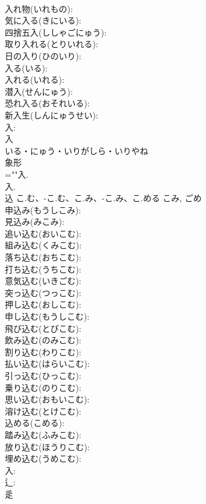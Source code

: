 \documentclass[8pt]{extreport}
\begin{document}
\begin{CJK}{UTF8}{min}
\\	入れ物(いれもの): 
\\	気に入る(きにいる): 
\\	四捨五入(ししゃごにゅう): 
\\	取り入れる(とりいれる): 
\\	日の入り(ひのいり): 
\\	入る(いる): 
\\	入れる(いれる): 
\\	潜入(せんにゅう): 
\\	恐れ入る(おそれいる): 
\\	新入生(しんにゅうせい): 
\\	入: 
\\	入	
\\	いる・にゅう・いりがしら・いりやね	
\\	象形 
\\	=""入.
\\	入.
\\	込		こ.む、-こ.む、こ.み、-こ.み、こ.める	こみ, ごめ	
\\	申込み(もうしこみ): 
\\	見込み(みこみ): 
\\	追い込む(おいこむ): 
\\	組み込む(くみこむ): 
\\	落ち込む(おちこむ): 
\\	打ち込む(うちこむ): 
\\	意気込む(いきごむ): 
\\	突っ込む(つっこむ): 
\\	押し込む(おしこむ): 
\\	申し込む(もうしこむ): 
\\	飛び込む(とびこむ): 
\\	飲み込む(のみこむ): 
\\	割り込む(わりこむ): 
\\	払い込む(はらいこむ): 
\\	引っ込む(ひっこむ): 
\\	乗り込む(のりこむ): 
\\	思い込む(おもいこむ): 
\\	溶け込む(とけこむ): 
\\	込める(こめる): 
\\	踏み込む(ふみこむ): 
\\	放り込む(ほうりこむ): 
\\	埋め込む(うめこむ): 
\\	入: 
\\	辶: 
\\	辵	

\end{CJK}
\end{document}
